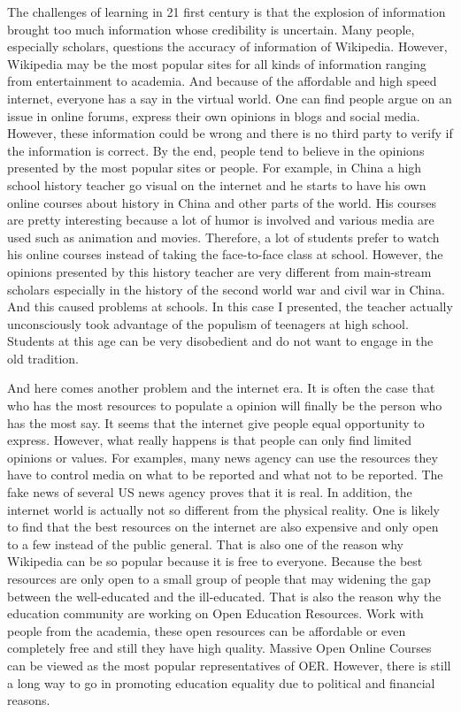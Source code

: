 \documentclass[sigconf]{acmart}
\begin{document}
The challenges of learning in 21 first century is that the explosion of information brought too much information whose credibility is uncertain. Many people, especially scholars, questions the accuracy of  information of Wikipedia. However, Wikipedia may be the most popular sites for all kinds of information ranging from entertainment to academia. And because of the affordable and high speed internet, everyone has a say in the virtual world. One can find people argue on an issue in online forums, express their own opinions in blogs and social media. However, these information could be wrong and there is no third party to verify if the information is correct. By the end, people tend to believe in the opinions presented by the most popular sites or people. For example, in China a high school history teacher go visual on the internet and he starts to have his own online courses about history in China and other parts of the world. His courses are pretty interesting because a lot of humor is involved and various media are used such as animation and movies. Therefore, a lot of students prefer to watch his online courses instead of taking the face-to-face class at school. However, the opinions presented by this history teacher are very different from main-stream scholars especially in the history of the second world war and civil war in China. And this caused problems at schools. In this case I presented, the teacher actually unconsciously took advantage of the populism of teenagers at high school. Students at this age can be very disobedient and do not want to engage in the old tradition. 

And here comes another problem and the internet era. It is often the case that who has the most resources to populate a opinion will finally be the person who has the most say. It seems that the internet give people equal opportunity to express. However,  what really happens is that people can only find limited opinions or values. For examples, many news agency can use the resources they have to control media on what to be reported and what not to be reported. The fake news of several US news agency proves that it is real. In addition, the internet world is actually not so different from the physical reality. One is likely to find that the best resources on the internet are also expensive and only open to a few instead of the public general. That is also one of the reason why Wikipedia can be so popular because it is free to everyone. Because the best resources are only open to a small group of people that may widening the gap between the well-educated and the ill-educated. That is also the reason why the education community are working on Open Education Resources. Work with people from the academia, these open resources can be affordable or even completely free and still they have high quality. Massive Open Online Courses can be viewed as the most popular representatives of OER. However, there is still a long way to go in promoting education equality due to political and financial reasons.
\end{document}
